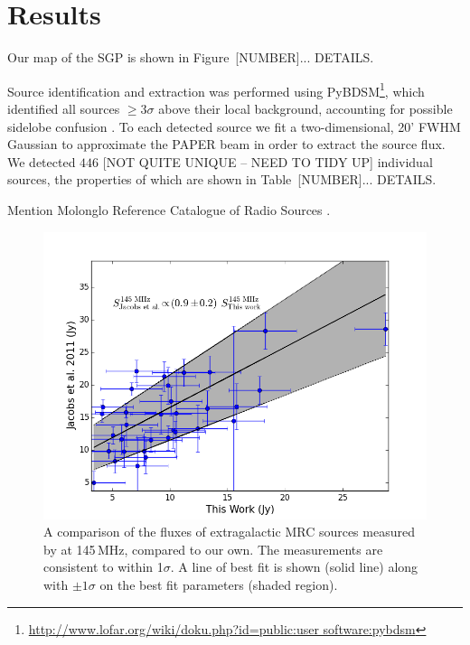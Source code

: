 \documentclass[preprint2,epsf,epsfig,graphics]{emulateapj}
\begin{document}
\section{Results}
\label{sec:res}

Our map of the SGP is shown in Figure~{\color{red}[NUMBER]... DETAILS}.

Source identification and extraction was performed using PyBDSM\footnote{\url{http://www.lofar.org/wiki/doku.php?id=public:user software:pybdsm}}, which identified all sources $\geq3\sigma$ above their local background, accounting for possible sidelobe confusion \citep{PyBDSM.15}. To each detected source we fit a two-dimensional, 20' FWHM Gaussian to approximate the PAPER beam \citep{Parsons.10} in order to extract the source flux. We detected $446$ {\color{red} [NOT QUITE UNIQUE -- NEED TO TIDY UP]} individual sources, the properties of which are shown in Table~{\color{red}[NUMBER]... DETAILS}. 

Mention Molonglo Reference Catalogue of Radio Sources \citep[MRC][]{Large.81} .

\begin{figure}
\includegraphics[width=\columnwidth]{us_and_danny_cal.png}
\caption{A comparison of the fluxes of extragalactic MRC sources measured by \cite{Jacobs.11} at 145\,MHz, compared to our own. The measurements are consistent to within 1$\sigma$. A line of best fit is shown (solid line) along with $\pm1\sigma$ on the best fit parameters (shaded region).}
\end{figure}
\end{document}
